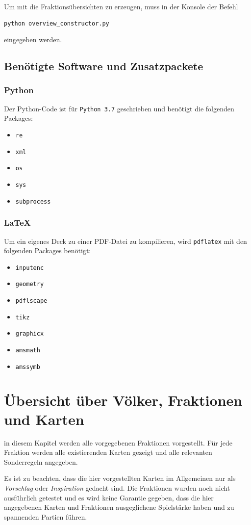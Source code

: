 \documentclass[a4paper,11pt]{report}
\begin{document}
Um mit die Fraktionsübersichten zu erzeugen, muss in der Konsole der Befehl
\begin{lstlisting}
python overview_constructor.py
\end{lstlisting}
eingegeben werden.

\section{Benötigte Software und Zusatzpackete}
\subsection{Python}
Der Python-Code ist für \verb+Python 3.7+ geschrieben und benötigt die folgenden Packages:
\begin{itemize}
	\item \verb+re+
	\item \verb+xml+
	\item \verb+os+
	\item \verb+sys+
	\item \verb+subprocess+
\end{itemize}

\subsection{\LaTeX}
Um ein eigenes Deck zu einer PDF-Datei zu kompilieren, wird \verb+pdflatex+ mit den folgenden Packages benötigt:
\begin{itemize}
	\item \verb+inputenc+
	\item \verb+geometry+
	\item \verb+pdflscape+
	\item \verb+tikz+
	\item \verb+graphicx+
	\item \verb+amsmath+
	\item \verb+amssymb+
\end{itemize}

\chapter{Übersicht über Völker, Fraktionen und Karten}\label{ch:uebersicht}
in diesem Kapitel werden alle vorgegebenen Fraktionen vorgestellt. Für jede Fraktion werden alle existierenden Karten gezeigt und alle relevanten Sonderregeln angegeben.

Es ist zu beachten, dass die hier vorgestellten Karten im Allgemeinen nur als \emph{Vorschlag} oder \emph{Inspiration} gedacht sind. Die Fraktionen wurden noch nicht ausführlich getestet und es wird keine Garantie gegeben, dass die hier angegebenen Karten und Fraktionen ausgeglichene Spielstärke haben und zu spannenden Partien führen.
\end{document}
